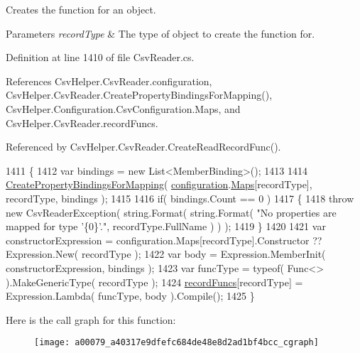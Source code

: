Creates the function for an object. 


\begin{DoxyParams}{Parameters}
{\em record\-Type} & The type of object to create the function for.\\
\hline
\end{DoxyParams}


Definition at line 1410 of file Csv\-Reader.\-cs.



References Csv\-Helper.\-Csv\-Reader.\-configuration, Csv\-Helper.\-Csv\-Reader.\-Create\-Property\-Bindings\-For\-Mapping(), Csv\-Helper.\-Configuration.\-Csv\-Configuration.\-Maps, and Csv\-Helper.\-Csv\-Reader.\-record\-Funcs.



Referenced by Csv\-Helper.\-Csv\-Reader.\-Create\-Read\-Record\-Func().


\begin{DoxyCode}
1411         \{
1412             var bindings = \textcolor{keyword}{new} List<MemberBinding>();
1413 
1414             \hyperlink{a00079_a5d8c85bf8923d38ead3df9b9463f3eae}{CreatePropertyBindingsForMapping}( 
      \hyperlink{a00079_a695622911e45cbac8d67dcbd9a3e2967}{configuration}.\hyperlink{a00065_a9119c99f5dafba985718f631f7bfa16a}{Maps}[recordType], recordType, bindings );
1415 
1416             \textcolor{keywordflow}{if}( bindings.Count == 0 )
1417             \{
1418                 \textcolor{keywordflow}{throw} \textcolor{keyword}{new} CsvReaderException( \textcolor{keywordtype}{string}.Format( \textcolor{keywordtype}{string}.Format( \textcolor{stringliteral}{"No properties are mapped for
       type '\{0\}'."}, recordType.FullName ) ) );
1419             \}
1420 
1421             var constructorExpression = configuration.Maps[recordType].Constructor ?? Expression.New( 
      recordType );
1422             var body = Expression.MemberInit( constructorExpression, bindings );
1423             var funcType = typeof( Func<> ).MakeGenericType( recordType );
1424             \hyperlink{a00079_af8fa2e4c94750a1d6df3112d5f1d701c}{recordFuncs}[recordType] = Expression.Lambda( funcType, body ).Compile();
1425         \}
\end{DoxyCode}


Here is the call graph for this function\-:
\nopagebreak
\begin{figure}[H]
\begin{center}
\leavevmode
\texttt{[image: a00079\_a40317e9dfefc684de48e8d2ad1bf4bcc\_cgraph]}
\end{center}
\end{figure}





